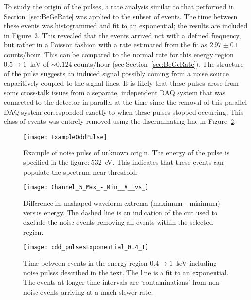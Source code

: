 	To study the origin of the pulses, a rate analysis similar to that performed in Section~\ref{sec:BeGeRate} was applied to the subset of events.  The time between these events was histogrammed and fit to an exponential; the results are included in Figure~\ref{fig:OddPulseRate}.  This revealed that the events arrived not with a defined frequency, but rather in a Poisson fashion with a rate estimated from the fit as $2.97 \pm 0.1$ counts/hour.  This can be compared to the normal rate for this energy region $0.5\to1$~keV of $\sim0.124$ counts/hour (see Section~\ref{sec:BeGeRate}).  The structure of the pulse suggests an induced signal possibly coming from a noise source capacitively-coupled to the signal lines.  It is likely that these pulses arose from some cross-talk issues from a separate, independent DAQ system that was connected to the detector in parallel at the time since the removal of this parallel DAQ system corresponded exactly to when these pulses stopped occurring.  This class of events was entirely removed using the discriminating line in Figure~\ref{fig:OddPulseCut}.
	
	
			\begin{figure}
				\centering
				\texttt{[image: ExampleOddPulse]}
				\caption[Example of noise pulse of unknown origin]
				{Example of noise pulse of unknown origin.  The energy of the pulse is specified in the figure: 532~eV. 
				This indicates that these events can populate the spectrum near threshold.}
				\label{fig:OddPulseExample}
			\end{figure}	

			\begin{figure}
				\centering
				\texttt{[image: Channel\_5\_Max\_-\_Min\_\_V\_\_vs\_]}
				\caption[Difference in unshaped waveform extrema versus energy]
				{Difference in unshaped waveform extrema (maximum - minimum) versus energy.  The dashed line is an indication of the cut used to exclude the 
				noise events removing all events within the selected region. }
				\label{fig:OddPulseCut}
			\end{figure}

			\begin{figure}
				\centering
				\texttt{[image: odd\_pulsesExponential\_0.4\_1]}
				\caption[Time between noise pulses]
				{Time between events in the energy region $0.4\to1$~keV including noise pulses described in the text. 
				 The line is a fit to an exponential.  The events at longer time intervals are `contaminations' from non-noise
				 events arriving at a much slower rate.}
				\label{fig:OddPulseRate}
			\end{figure}
				
